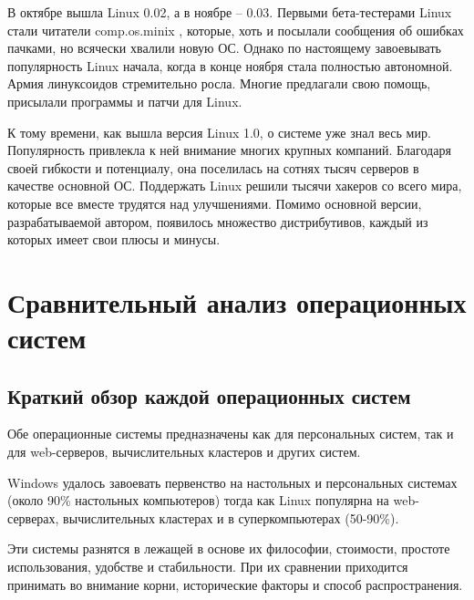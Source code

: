 \documentclass[14pt]{article}
\begin{document}
    В октябре вышла Linux 0.02, а в ноябре – 0.03. Первыми бета-тестерами Linux стали читатели comp.os.minix , которые, хоть и посылали сообщения об ошибках пачками, но всячески хвалили новую ОС.
    Однако по настоящему завоевывать популярность Linux начала, когда в конце ноября стала полностью автономной.
    Армия линуксоидов стремительно росла.
    Многие предлагали свою помощь, присылали программы и патчи для Linux.

    К тому времени, как вышла версия Linux 1.0, о системе уже знал весь мир.
    Популярность привлекла к ней внимание многих крупных компаний.
    Благодаря своей гибкости и потенциалу, она поселилась на сотнях тысяч серверов в качестве основной ОС.
    Поддержать Linux решили тысячи хакеров со всего мира, которые все вместе трудятся над улучшениями.
    Помимо основной версии, разрабатываемой автором, появилось множество дистрибутивов, каждый из которых имеет свои плюсы и минусы.

    \newpage
    \section{Сравнительный анализ операционных систем}
    \subsection{Краткий обзор каждой операционных систем}
    Обе операционные системы предназначены как для персональных систем, так и для web-серверов, вычислительных кластеров и других систем.

    Windows удалось завоевать первенство на настольных и персональных системах (около 90\% настольных компьютеров) тогда как Linux популярна на web-серверах, вычислительных кластерах и в суперкомпьютерах (50-90\%).

    Эти системы разнятся в лежащей в основе их философии, стоимости, простоте использования, удобстве и стабильности.
    При их сравнении приходится принимать во внимание корни, исторические факторы и способ распространения.
\end{document}
